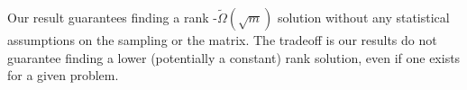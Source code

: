 Our result guarantees finding a rank -$\tilde{\Omega}(\sqrt{m})$ solution without any statistical assumptions on the sampling or the matrix. The tradeoff is our results do not guarantee finding a lower (potentially a constant) rank solution, even if one exists for a given problem. 


%
%
%
%
%
%
